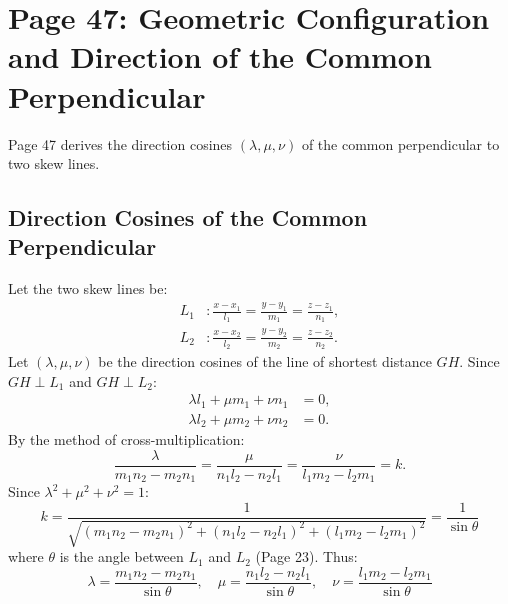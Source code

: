 \section{Page 47: Geometric Configuration and Direction of the Common Perpendicular}
\label{sec:page47}

\begin{conceptbox}
Page 47 derives the direction cosines $(\lambda, \mu, \nu)$ of the common perpendicular to two skew lines.
\end{conceptbox}

\subsection{Direction Cosines of the Common Perpendicular}
Let the two skew lines be:
\begin{align}
    L_1 &: \frac{x - x_1}{l_1} = \frac{y - y_1}{m_1} = \frac{z - z_1}{n_1}, \\
    L_2 &: \frac{x - x_2}{l_2} = \frac{y - y_2}{m_2} = \frac{z - z_2}{n_2}.
\end{align}
Let $(\lambda, \mu, \nu)$ be the direction cosines of the line of shortest distance $GH$.
Since $GH \perp L_1$ and $GH \perp L_2$:
\begin{align}
    \lambda l_1 + \mu m_1 + \nu n_1 &= 0, \label{eq:p47_gh1} \\
    \lambda l_2 + \mu m_2 + \nu n_2 &= 0. \label{eq:p47_gh2}
\end{align}
By the method of cross-multiplication:
\begin{equation}
    \frac{\lambda}{m_1 n_2 - m_2 n_1} = \frac{\mu}{n_1 l_2 - n_2 l_1} = \frac{\nu}{l_1 m_2 - l_2 m_1} = k.
\end{equation}
Since $\lambda^2 + \mu^2 + \nu^2 = 1$:
\begin{equation}
    k = \frac{1}{\sqrt{(m_1 n_2 - m_2 n_1)^2 + (n_1 l_2 - n_2 l_1)^2 + (l_1 m_2 - l_2 m_1)^2}} = \frac{1}{\sin\theta}
\end{equation}
where $\theta$ is the angle between $L_1$ and $L_2$ (Page 23).
Thus:
\begin{equation}
    \boxed{\lambda = \frac{m_1 n_2 - m_2 n_1}{\sin\theta}, \quad \mu = \frac{n_1 l_2 - n_2 l_1}{\sin\theta}, \quad \nu = \frac{l_1 m_2 - l_2 m_1}{\sin\theta}}
\end{equation}

